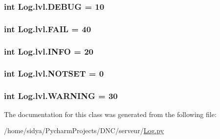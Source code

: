 \subsubsection[{D\+E\+B\+U\+G}]{\setlength{\rightskip}{0pt plus 5cm}int Log.\+lvl.\+D\+E\+B\+U\+G = 10\hspace{0.3cm}{\ttfamily [static]}}\label{class_log_1_1lvl_abbee3fe06a1896a4bd13d4901f0a892f}
\hypertarget{class_log_1_1lvl_a9e0eb8280b2ca2279616b80933316159}{}
\subsubsection[{F\+A\+I\+L}]{\setlength{\rightskip}{0pt plus 5cm}int Log.\+lvl.\+F\+A\+I\+L = 40\hspace{0.3cm}{\ttfamily [static]}}\label{class_log_1_1lvl_a9e0eb8280b2ca2279616b80933316159}
\hypertarget{class_log_1_1lvl_af306f6ac0ec77f65ca3a35592b148adb}{}
\subsubsection[{I\+N\+F\+O}]{\setlength{\rightskip}{0pt plus 5cm}int Log.\+lvl.\+I\+N\+F\+O = 20\hspace{0.3cm}{\ttfamily [static]}}\label{class_log_1_1lvl_af306f6ac0ec77f65ca3a35592b148adb}
\hypertarget{class_log_1_1lvl_a02d1cd2ef3bdac4d2f84facb74452685}{}
\subsubsection[{N\+O\+T\+S\+E\+T}]{\setlength{\rightskip}{0pt plus 5cm}int Log.\+lvl.\+N\+O\+T\+S\+E\+T = 0\hspace{0.3cm}{\ttfamily [static]}}\label{class_log_1_1lvl_a02d1cd2ef3bdac4d2f84facb74452685}
\hypertarget{class_log_1_1lvl_a453dc11d5d9bdccefd63d5794d9aee47}{}
\subsubsection[{W\+A\+R\+N\+I\+N\+G}]{\setlength{\rightskip}{0pt plus 5cm}int Log.\+lvl.\+W\+A\+R\+N\+I\+N\+G = 30\hspace{0.3cm}{\ttfamily [static]}}\label{class_log_1_1lvl_a453dc11d5d9bdccefd63d5794d9aee47}


The documentation for this class was generated from the following file\+:\begin{DoxyCompactItemize}
\item 
/home/sidya/\+Pycharm\+Projects/\+D\+N\+C/serveur/\hyperlink{_log_8py}{Log.\+py}\end{DoxyCompactItemize}
